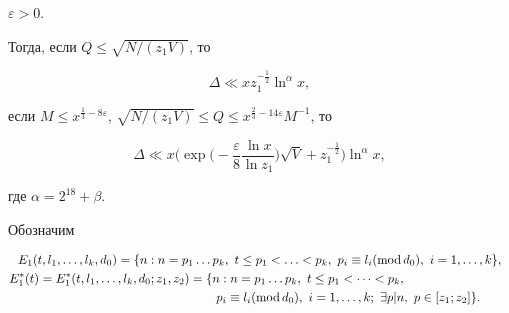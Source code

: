\begin{lem}
$\varepsilon > 0$.





Тогда, если $Q \le \sqrt {N/(z_1 V)}$, то


$$


\Delta \ll x z_1^{- \frac12} \ln^{\alpha} x,


$$


если $M \le x^{\frac13 - 8 \varepsilon}$, $\sqrt{N / (z_1


V)} \le Q \le x^{ \frac23 - 14 \varepsilon} M^{-1}$, то


$$


\Delta \ll x \bigg( \exp \bigg( - \frac{\varepsilon}8 \frac{\ln


x}{\ln z_1} \bigg) \sqrt V + z_1^{-\frac12} \bigg)


\ln^{\alpha} x,


$$


где $\alpha = 2^{18} + \beta$.


\end{lem}





Обозначим


\begin{gather*}


E_1(t,l_1,\dotsc,l_k,d_0)=


\{n: n = p_1 \dotsc p_k, \ t \le p_1 < \dotsc < p_k,


\ p_i \equiv l_i (\Mod d_0), \ i=1, \dotsc, k \},\\


%


E^*_1 (t) =E^*_1(t,l_1,\dotsc,l_k,d_0;z_1,z_2)


= \{n: n = p_1 \dotsc p_k, \ t \le p_1 < \dotsb <


p_k,\hspace{30mm} \\


\hspace{50mm}p_i \equiv l_i (\Mod d_0), \ i=1, \dotsc, k; \ \exists


p|n, \ p \in [z_1;z_2] \}.


\end{gather*}





